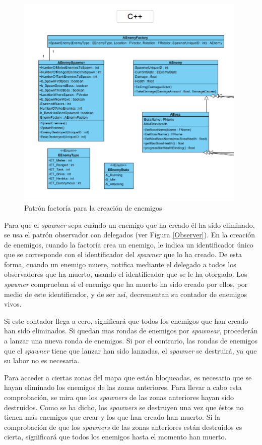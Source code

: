 
\begin{figure}[H]
  \centering
  \includegraphics[width=11cm]{./images/FactoryPattern.png}
  \caption{Patrón factoría para la creación de enemigos}
  \label{Factory}
\end{figure}

Para que el \textit{spawner} sepa cuándo un enemigo que ha creado él ha sido eliminado, se usa el patrón observador con delegados (ver Figura \ref{Observer}). En la creación de enemigos, cuando la factoría crea un enemigo, le indica un identificador único que se corresponde con el identificador del \textit{spawner} que lo ha creado. De esta forma, cuando un enemigo muere, notifica mediante el delegado a todos los observadores que ha muerto, usando el identificador que se le ha otorgado. Los \textit{spawner} comprueban si el enemigo que ha muerto ha sido creado por ellos, por medio de este identificador, y de ser así, decrementan su contador de enemigos vivos.

Si este contador llega a cero, significará que todos los enemigos que han creado han sido eliminados. Si quedan mas rondas de enemigos por \textit{spawnear}, procederán a lanzar una nueva ronda de enemigos. Si por el contrario, las rondas de enemigos que el \textit{spawner} tiene que lanzar han sido lanzadas, el \textit{spawner} se destruirá, ya que su labor no es necesaria.

Para acceder a ciertas zonas del mapa que están bloqueadas, es necesario que se hayan eliminado los enemigos de las zonas anteriores. Para llevar a cabo esta comprobación, se mira que los \textit{spawners} de las zonas anteriores hayan sido destruidos. Como se ha dicho, los \textit{spawners} se destruyen una vez que éstos no tienen más enemigos que crear y los que han creado han muerto. Si la comprobación de que los \textit{spawners} de las zonas anteriores están destruidos es cierta, significará que todos los enemigos hasta el momento han muerto.

